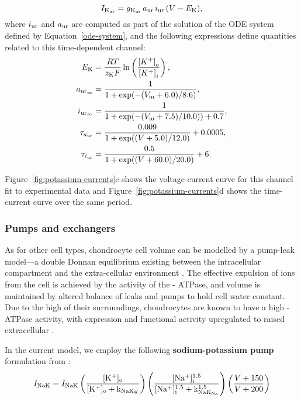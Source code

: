 \begin{equation}
    I_{\rm K_{\rm ur}} = g_{\rm K_{\rm ur}}\, a_{\rm ur}\, i_{\rm
      ur}\, (V - E_{\rm K}),
\end{equation}
where $i_{\rm ur}$ and $a_{\rm ur}$ are computed as part of the
solution of the ODE system defined by Equation~\ref{ode-system}, and
the following expressions define quantities related to this
time-dependent channel:
\begin{equation*}
  \begin{split}
    E_{\rm K} & =  \frac{R T}{z_{\rm K} F}
    \ln\left(\frac{\left[K^{+}\right]_{o}}
      {\left[K^{+}\right]_{i}}\right),\\
    a_{{\rm ur}_{\infty}} & = \frac{1}{1 + \exp(-(V_{\rm m} +
      6.0)/8.6)},\\
    i_{{\rm ur}_{\infty}} & = \frac{1}{1 + \exp(-(V_{\rm m} +
      7.5)/10.0)) + 0.7},\\
    \tau_{a_{\rm ur}} & = \frac{0.009}{1 + \exp((V + 5.0)/12.0)} +
    0.0005,\\
    \tau_{i_{\rm ur}} & = \frac{0.5}{1 + \exp((V +60.0)/20.0)} +
    6.\\
  \end{split}
\end{equation*}

Figure~\ref{fig:potassium-currents}c shows the voltage-current
curve for this channel fit to experimental data
\citep{Clarketal2011} and Figure~\ref{fig:potassium-currents}d shows
the time-current curve over the same period.

\subsubsection*{Pumps and exchangers}
\label{sec:pumps-and-exchangers}

As for other cell types, chondrocyte cell volume can be modelled by a
pump-leak model---a double Donnan equilibrium existing between the
intracellular compartment and the extra-cellular environment
\citep{Stockwell1991}. The effective expulsion of \Na{} ions from the
cell is achieved by the activity of the \Na-\K{} ATPase, and volume is
maintained by altered balance of leaks and pumps to hold cell water
constant. Due to the high \Nao{} of their surroundings, chondrocytes are
known to have a high \Na-\K{} ATPase activity, with expression and
functional activity upregulated to raised extracellular \Na{}
\citep{Mobasherietal1997}.

In the current model, we employ the following {\bf sodium-potassium
  pump} formulation from \citet{Nygrenetal1998}:
\begin{equation}
  I_{\rm NaK} =
  \bar{I}_{\rm NaK} \left( \frac{[\rm K^{+}]_{\rm o}}{[\rm K^{+}]_{\rm o} +
    k_{\rm NaK_{K}}} \right) \left(\frac{[\rm Na^{+}]^{1.5}_{\rm i}}{[\rm
    Na^{+}]^{1.5}_{\rm i} + k^{1.5}_{\rm NaK_{Na}}}\right) \left( \frac{V + 150}{V +
    200} \right)
\end{equation}

